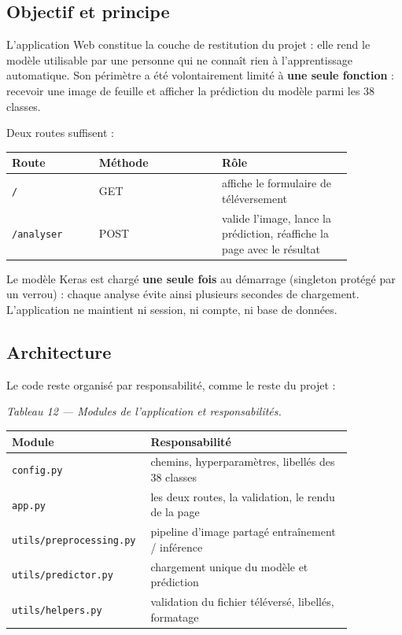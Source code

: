 \documentclass[10pt,a4paper]{article}
\begin{document}
\subsection{Objectif et principe}

L'application Web constitue la couche de restitution du projet : elle rend le modèle utilisable par une personne qui ne connaît rien à l'apprentissage automatique. Son périmètre a été volontairement limité à \textbf{une seule fonction} : recevoir une image de feuille et afficher la prédiction du modèle parmi les 38 classes.

Deux routes suffisent :

{\footnotesize
\begin{longtable}{@{}>{\raggedright\arraybackslash}p{0.22\linewidth}>{\raggedright\arraybackslash}p{0.31\linewidth}>{\raggedright\arraybackslash}p{0.33\linewidth}@{}}
\toprule
\textbf{Route} & \textbf{Méthode} & \textbf{Rôle} \\
\midrule
\endhead
\bottomrule
\endlastfoot
\texttt{/\allowbreak{}} & GET & affiche le formulaire de téléversement \\
\texttt{/\allowbreak{}analyser} & POST & valide l'image, lance la prédiction, réaffiche la page avec le résultat \\
\end{longtable}
}

Le modèle Keras est chargé \textbf{une seule fois} au démarrage (singleton protégé par un verrou) : chaque analyse évite ainsi plusieurs secondes de chargement. L'application ne maintient ni session, ni compte, ni base de données.

\subsection{Architecture}

Le code reste organisé par responsabilité, comme le reste du projet :

\begin{center}\small\itshape Tableau 12 --- Modules de l'application et responsabilités.\end{center}
{\footnotesize
\begin{longtable}{@{}>{\raggedright\arraybackslash}p{0.28\linewidth}>{\raggedright\arraybackslash}p{0.58\linewidth}@{}}
\toprule
\textbf{Module} & \textbf{Responsabilité} \\
\midrule
\endhead
\bottomrule
\endlastfoot
\texttt{config.py} & chemins, hyperparamètres, libellés des 38 classes \\
\texttt{app.py} & les deux routes, la validation, le rendu de la page \\
\texttt{utils/\allowbreak{}preprocessing.py} & pipeline d'image partagé entraînement / inférence \\
\texttt{utils/\allowbreak{}predictor.py} & chargement unique du modèle et prédiction \\
\texttt{utils/\allowbreak{}helpers.py} & validation du fichier téléversé, libellés, formatage \\
\end{longtable}
}
\end{document}
